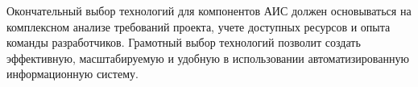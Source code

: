 Окончательный выбор технологий для компонентов АИС должен основываться на комплексном анализе требований проекта, 
учете доступных ресурсов и опыта команды разработчиков. Грамотный выбор технологий позволит создать эффективную, 
масштабируемую и удобную в использовании автоматизированную информационную систему.
